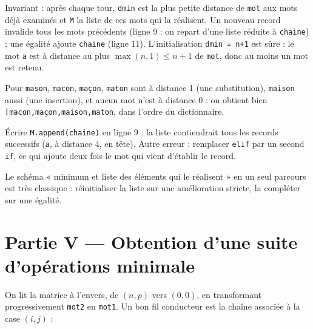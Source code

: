 \documentclass[11pt,a4paper]{article}
\begin{document}
Invariant : après chaque tour, \texttt{dmin} est la plus petite distance de \texttt{mot} aux mots déjà examinés et \texttt{M} la liste de ces mots qui la réalisent. Un nouveau record invalide tous les mots précédents (ligne 9 : on repart d'une liste réduite à \texttt{chaine}) ; une égalité ajoute \texttt{chaine} (ligne 11). L'initialisation \texttt{dmin\ =\ n+1} est sûre : le mot \texttt{\textquotesingle{}a\textquotesingle{}} est à distance au plus \(\max(n,1)\le n+1\) de \texttt{mot}, donc au moins un mot est retenu.

Pour \texttt{\textquotesingle{}mason\textquotesingle{}}, \texttt{\textquotesingle{}macon\textquotesingle{}}, \texttt{\textquotesingle{}maçon\textquotesingle{}}, \texttt{\textquotesingle{}maton\textquotesingle{}} sont à distance 1 (une substitution), \texttt{\textquotesingle{}maison\textquotesingle{}} aussi (une insertion), et aucun mot n'est à distance 0 : on obtient bien \texttt{{[}\textquotesingle{}macon\textquotesingle{},\allowbreak{}\textquotesingle{}maçon\textquotesingle{},\allowbreak{}\textquotesingle{}maison\textquotesingle{},\allowbreak{}\textquotesingle{}maton\textquotesingle{}{]}\allowbreak{}}, dans l'ordre du dictionnaire.

\begin{piege}

Écrire \texttt{M.append(chaine)} en ligne 9 : la liste contiendrait tous les records successifs (\texttt{\textquotesingle{}a\textquotesingle{}}, à distance 4, en tête). Autre erreur : remplacer \texttt{elif} par un second \texttt{if}, ce qui ajoute deux fois le mot qui vient d'établir le record.

\end{piege}

\begin{methode}

Le schéma « minimum et liste des éléments qui le réalisent » en un seul parcours est très classique : réinitialiser la liste sur une amélioration stricte, la compléter sur une égalité.

\end{methode}

\hypertarget{partie-v-obtention-dune-suite-dopuxe9rations-minimale}{%
\section{Partie V --- Obtention d'une suite d'opérations minimale}\label{partie-v-obtention-dune-suite-dopuxe9rations-minimale}}

On lit la matrice à l'envers, de \((n,p)\) vers \((0,0)\), en transformant progressivement \texttt{mot2} en \texttt{mot1}. Un bon fil conducteur est la chaîne associée à la case \((i,j)\) :
\end{document}
